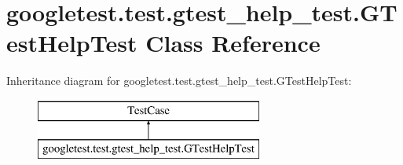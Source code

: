 \hypertarget{classgoogletest_1_1test_1_1gtest__help__test_1_1_g_test_help_test}{}\section{googletest.\+test.\+gtest\+\_\+help\+\_\+test.\+G\+Test\+Help\+Test Class Reference}
\label{classgoogletest_1_1test_1_1gtest__help__test_1_1_g_test_help_test}
Inheritance diagram for googletest.\+test.\+gtest\+\_\+help\+\_\+test.\+G\+Test\+Help\+Test\+:\begin{figure}[H]
\begin{center}
\leavevmode
\includegraphics[height=2.000000cm]{df/d82/classgoogletest_1_1test_1_1gtest__help__test_1_1_g_test_help_test}
\end{center}
\end{figure}

